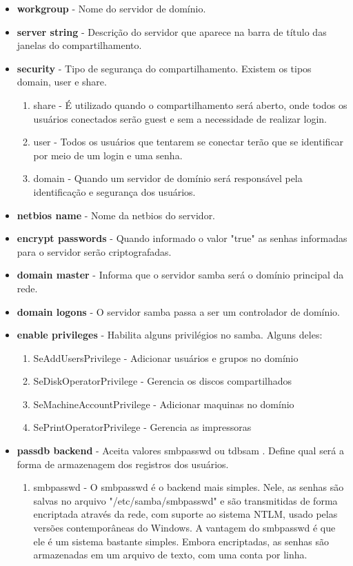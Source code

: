 \begin{itemize}
	\item \textbf{workgroup} - Nome do servidor de domínio.
	\item \textbf{server string} - Descrição do servidor que aparece na barra de título das janelas do compartilhamento.
	\item \textbf{security} - Tipo de segurança do compartilhamento. Existem os tipos domain, user e share.
		\begin{enumerate}
			\item {share}  - É utilizado quando o compartilhamento será aberto, onde todos os usuários conectados serão guest e sem a necessidade de realizar login.
			\item {user} - Todos os usuários que tentarem se conectar terão que se identificar por meio de um login e uma senha.
			\item {domain} - Quando um servidor de domínio será responsável pela identificação e segurança dos usuários.
		\end{enumerate} 
	\item \textbf{netbios name} - Nome da netbios do servidor.
	\item \textbf{encrypt passwords} - Quando informado o valor "true" as senhas informadas para o servidor serão criptografadas.
	\item \textbf{domain master} - Informa que o servidor samba será o domínio principal da rede.
	\item \textbf{domain logons} - O servidor samba passa a ser um controlador de domínio.
	\item \textbf{enable privileges} - Habilita alguns privilégios no samba. Alguns deles:
		\begin{enumerate}
			\item {SeAddUsersPrivilege} - Adicionar usuários e grupos no domínio 
			\item {SeDiskOperatorPrivilege} - Gerencia os discos compartilhados 
			\item {SeMachineAccountPrivilege} - Adicionar maquinas no domínio 
			\item {SePrintOperatorPrivilege} - Gerencia as impressoras
		\end{enumerate}
	\item \textbf{passdb backend} - Aceita valores smbpasswd ou tdbsam . Define qual será a forma de armazenagem dos registros dos usuários.
		\begin{enumerate}
			\item{smbpasswd} - O smbpasswd é o backend mais simples. Nele, as senhas são salvas no arquivo "/etc/samba/smbpasswd" e são transmitidas de forma encriptada através da rede, com suporte ao sistema NTLM, usado pelas versões contemporâneas do Windows. A vantagem do smbpasswd é que ele é um sistema bastante simples. Embora encriptadas, as senhas são armazenadas em um arquivo de texto, com uma conta por linha.\cite{BACKEND}

\end{enumerate}
\end{itemize}
